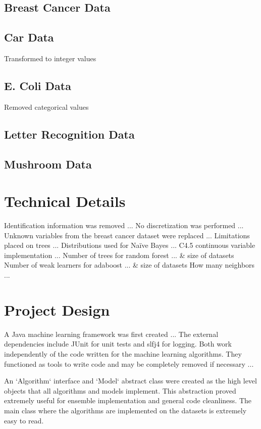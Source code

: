 \documentclass[11pt]{article}
\begin{document}
\subsection{Breast Cancer Data}
\subsection{Car Data}
Transformed to integer values

\subsection{E. Coli Data}
Removed categorical values

\subsection{Letter Recognition Data}
\subsection{Mushroom Data}

\section{Technical Details}
Identification information was removed ...
No discretization was performed ...
Unknown variables from the breast cancer dataset were replaced ...
Limitations placed on trees ...
Distributions used for Naïve Bayes ...
C4.5 continuous variable implementation ...
Number of trees for random forest ... & size of datasets
Number of weak learners for adaboost ... & size of datasets
How many neighbors ...

\section{Project Design}
A Java machine learning framework was first created ...
The external dependencies include JUnit for unit tests and slfj4 for logging. Both work independently of the code written for the machine learning algorithms. They functioned as tools to write code and may be completely removed if necessary ...

An `Algorithm` interface and `Model` abstract class were created as the high level objects that all algorithms and models implement. This abstraction proved extremely useful for ensemble implementation and general code cleanliness. The main class where the algorithms are implemented on the datasets is extremely easy to read.
\end{document}
